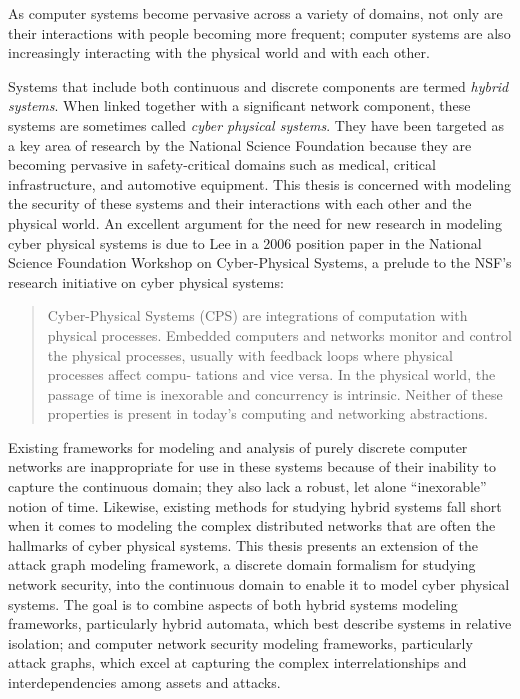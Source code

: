 As computer systems become pervasive across a variety of domains, not only are their interactions
with people becoming more frequent; computer systems are also increasingly interacting with the 
physical world and with each other.

Systems that include both continuous and discrete components are termed \emph{hybrid systems}.
When linked together with a significant network component, these systems are sometimes called
\emph{cyber physical systems}. They have been targeted as a key area of research by the National
Science Foundation because they
are becoming pervasive in safety-critical domains such as medical, critical infrastructure, and
automotive equipment. This thesis is concerned with modeling the security of these systems and
their interactions with each other and the physical world.
An excellent argument for the need for new research in modeling cyber physical systems
is due to Lee in a 2006 position paper in the National Science Foundation Workshop on Cyber-Physical Systems,
a prelude to the NSF's research initiative on cyber physical systems:
\begin{quote}
Cyber-Physical Systems (CPS) are integrations of computation with physical
processes. Embedded computers and networks monitor and control the physical
processes, usually with feedback loops where physical processes affect compu-
tations and vice versa. In the physical world, the passage of time is inexorable
and concurrency is intrinsic. Neither of these properties is present in today's
computing and networking abstractions. ~\cite{lee2006cyber}
\end{quote}

Existing frameworks for modeling and analysis of purely discrete computer networks are inappropriate for use in
these systems because of their inability to capture the continuous domain; they
also lack a robust, let alone ``inexorable'' notion of time. Likewise, existing
methods for studying hybrid systems fall short when it comes to modeling the complex distributed
networks that are often the hallmarks of cyber physical systems.
This thesis presents an extension of the attack graph modeling framework, 
a discrete domain formalism for studying network security, into the 
continuous domain to enable it to model cyber
physical systems. The goal is to combine aspects of both hybrid systems
modeling frameworks, particularly hybrid automata, which best describe systems in 
relative isolation; and computer network security modeling frameworks, particularly attack graphs,
which excel at capturing the complex interrelationships and interdependencies among assets and
attacks.

